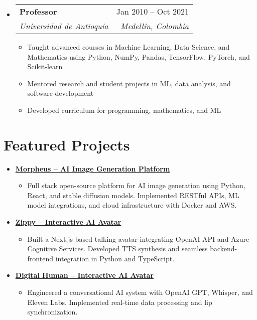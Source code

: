 \documentclass[letterpaper,11pt]{article}
\makeatletter
\newcommand{\resumeSubheading}[4]{
  \vspace{-2pt}
  \item[]
  \begin{tabular*}{\textwidth}{@{\extracolsep{\fill}}l r}
    \textbf{#1} & #2 \\
    \textit{#3} & \textit{#4} \\
  \end{tabular*}
  \vspace{-5pt}
}
\newcommand{\normalfaExternalLink}{{\mdseries\faExternalLink}}
\makeatother
\begin{document}
\begin{itemize}[leftmargin=0pt, itemindent=0pt, label={}, itemsep=1pt]
\resumeSubheading
{Professor}{Jan 2010 -- Oct 2021}
{Universidad de Antioquia}{Medellín, Colombia}
\begin{itemize}[leftmargin=*, itemsep=0pt]
    \item Taught advanced courses in Machine Learning, Data Science, and Mathematics using Python, NumPy, Pandas, TensorFlow, PyTorch, and Scikit-learn
    \item Mentored research and student projects in ML, data analysis, and software development
    \item Developed curriculum for programming, mathematics, and ML
\end{itemize}
\end{itemize}

\section{Featured Projects}
\begin{itemize}[leftmargin=*, itemsep=1pt]
    \item \textbf{\href{https://github.com/Monadical-SAS/Morpheus}{Morpheus -- AI Image Generation Platform \normalfaExternalLink}}
    \begin{itemize}[itemsep=0pt]
        \item Full stack open-source platform for AI image generation using Python, React, and stable diffusion models. Implemented RESTful APIs, ML model integrations, and cloud infrastructure with Docker and AWS.
    \end{itemize}
    \item \textbf{\href{https://github.com/asanchezyali/ai-avatar}{Zippy -- Interactive AI Avatar \normalfaExternalLink}}
    \begin{itemize}[itemsep=0pt]
        \item Built a Next.js-based talking avatar integrating OpenAI API and Azure Cognitive Services. Developed TTS synthesis and seamless backend-frontend integration in Python and TypeScript.
    \end{itemize}
    \item \textbf{\href{https://github.com/asanchezyali/talking-avatar-with-ai}{Digital Human -- Interactive AI Avatar \normalfaExternalLink}}
    \begin{itemize}[itemsep=0pt]
        \item Engineered a conversational AI system with OpenAI GPT, Whisper, and Eleven Labs. Implemented real-time data processing and lip synchronization.
    \end{itemize}
\end{itemize}
\end{document}

